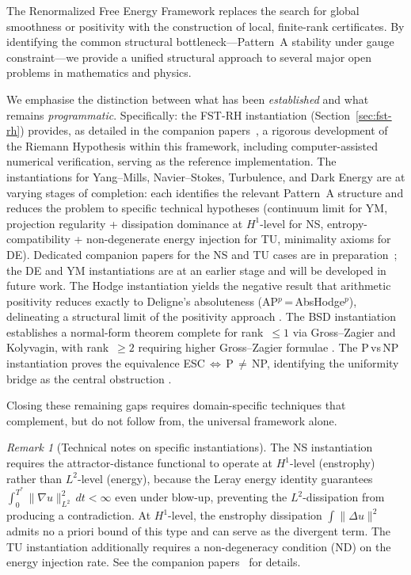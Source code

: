 \documentclass[12pt,a4paper]{article}
\theoremstyle{definition}
\theoremstyle{remark}
\newtheorem{remark}[theorem]{Remark}
\begin{document}
The Renormalized Free Energy Framework replaces the search for global smoothness or positivity with the construction of local, finite-rank certificates. By identifying the common structural bottleneck---Pattern~A stability under gauge constraint---we provide a unified structural approach to several major open problems in mathematics and physics.

We emphasise the distinction between what has been \emph{established} and what remains \emph{programmatic}. Specifically: the FST-RH instantiation (Section~\ref{sec:fst-rh}) provides, as detailed in the companion papers~\cite{Geiger2026a,Geiger2026b,Geiger2026c}, a rigorous development of the Riemann Hypothesis within this framework, including computer-assisted numerical verification, serving as the reference implementation. The instantiations for Yang--Mills, Navier--Stokes, Turbulence, and Dark Energy are at varying stages of completion: each identifies the relevant Pattern~A structure and reduces the problem to specific technical hypotheses (continuum limit for YM, projection regularity + dissipation dominance at $H^1$-level for NS, entropy-compatibility + non-degenerate energy injection for TU, minimality axioms for DE). Dedicated companion papers for the NS and TU cases are in preparation~\cite{Geiger2026-NS,Geiger2026-TU}; the DE and YM instantiations are at an earlier stage and will be developed in future work. The Hodge instantiation yields the negative result that arithmetic positivity reduces exactly to Deligne's absoluteness (AP$^p$\,=\,AbsHodge$^p$), delineating a structural limit of the positivity approach \cite{Geiger2026-Hodge}. The BSD instantiation establishes a normal-form theorem complete for rank~$\leq 1$ via Gross--Zagier and Kolyvagin, with rank~$\geq 2$ requiring higher Gross--Zagier formulae \cite{Geiger2026-BSD}. The P\,vs\,NP instantiation proves the equivalence ESC\,$\Leftrightarrow$\,P\,$\neq$\,NP, identifying the uniformity bridge as the central obstruction \cite{Geiger2026-PvsNP}.

Closing these remaining gaps requires domain-specific techniques that complement, but do not follow from, the universal framework alone.

\begin{remark}[Technical notes on specific instantiations]
\label{rem:technical-notes}
The NS instantiation requires the attractor-distance functional to operate at $H^1$-level (enstrophy) rather than $L^2$-level (energy), because the Leray energy identity guarantees $\int_0^{T^*}\|\nabla u\|_{L^2}^2\,dt < \infty$ even under blow-up, preventing the $L^2$-dissipation from producing a contradiction. At $H^1$-level, the enstrophy dissipation $\int\|\Delta u\|^2$ admits no a priori bound of this type and can serve as the divergent term. The TU instantiation additionally requires a non-degeneracy condition (ND) on the energy injection rate. See the companion papers~\cite{Geiger2026-NS,Geiger2026-TU} for details.
\end{remark}
\end{document}
